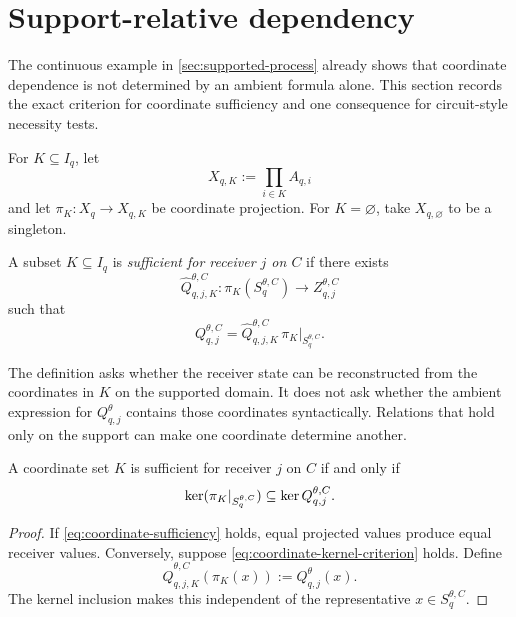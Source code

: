 \section{Support-relative dependency}
\label{sec:support-dependency}

The continuous example in \cref{sec:supported-process} already shows that coordinate dependence is not determined by an ambient formula alone. This section records the exact criterion for coordinate sufficiency and one consequence for circuit-style necessity tests.

For $K\subseteq I_q$, let
\[
X_{q,K}:=\prod_{i\in K}A_{q,i}
\]
and let $\pi_K:X_q\to X_{q,K}$ be coordinate projection. For $K=\varnothing$, take $X_{q,\varnothing}$ to be a singleton.

\begin{definition}
A subset $K\subseteq I_q$ is \emph{sufficient for receiver $j$ on $C$} if there exists
\[
\widehat Q_{q,j,K}^{\theta,C}:
\pi_K(S_q^{\theta,C})\to Z_{q,j}^{\theta,C}
\]
such that
\begin{equation}
Q_{q,j}^{\theta,C}
=
\widehat Q_{q,j,K}^{\theta,C}
\,\pi_K|_{S_q^{\theta,C}}.
\label{eq:coordinate-sufficiency}
\end{equation}
\end{definition}

The definition asks whether the receiver state can be reconstructed from the coordinates in $K$ on the supported domain. It does not ask whether the ambient expression for $Q_{q,j}^\theta$ contains those coordinates syntactically. Relations that hold only on the support can make one coordinate determine another.

\begin{proposition}
\label{prop:coordinate-sufficiency}
A coordinate set $K$ is sufficient for receiver $j$ on $C$ if and only if
\begin{equation}
\operatorname{ker}(\pi_K|_{S_q^{\theta,C}})
\subseteq
\operatorname{ker} Q_{q,j}^{\theta,C}.
\label{eq:coordinate-kernel-criterion}
\end{equation}
\end{proposition}

\begin{proof}
If \eqref{eq:coordinate-sufficiency} holds, equal projected values produce equal receiver values. Conversely, suppose \eqref{eq:coordinate-kernel-criterion} holds. Define
\[
\widehat Q_{q,j,K}^{\theta,C}(\pi_K(x))
:=Q_{q,j}^\theta(x).
\]
The kernel inclusion makes this independent of the representative $x\in S_q^{\theta,C}$.
\end{proof}

